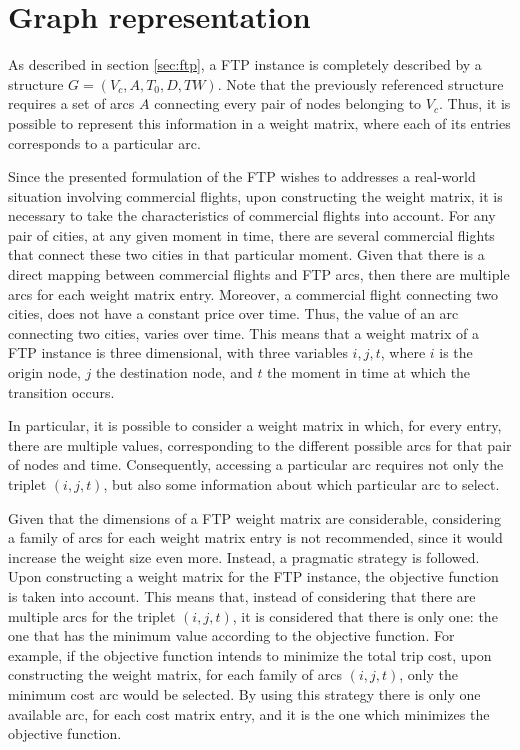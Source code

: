 \section{Graph representation}
\label{sec:ftp_graph}


As described in section \ref{sec:ftp}, a FTP instance is completely described by a structure 
$G =(V_c, A, T_{0}, D, TW)$. Note that the previously referenced structure requires a set of arcs $A$ connecting every pair of nodes belonging to $V_c$. Thus, it is possible to represent this information in a weight matrix, where each of its entries corresponds to a particular arc.

Since the presented formulation of the FTP wishes to addresses a real-world situation involving commercial flights, upon constructing the weight matrix, it is necessary to take the characteristics of commercial flights into account. For any pair of cities, at any given moment in time, there are several commercial flights that connect these two cities in that particular moment. Given that there is a direct mapping between commercial flights and FTP arcs, then there are multiple arcs for each weight matrix entry. Moreover, a commercial flight connecting two cities, does not have a constant price over time. Thus, the value of an arc connecting two cities, varies over time. This means that a weight matrix of a FTP instance is three dimensional, with three variables $i, j, t$, where $i$ is the origin node, $j$ the destination node, and $t$ the moment in time at which the transition occurs.

In particular, it is possible to consider a weight matrix in which, for every entry, there are multiple values, corresponding to the different possible arcs for that pair of nodes and time. Consequently, accessing a particular arc requires not only the triplet $(i, j, t)$, but also some information about which particular arc to select. 

Given that the dimensions of a FTP weight matrix are considerable, considering a family of arcs for each weight matrix entry is not recommended, since it would increase the weight size even more. Instead, a pragmatic strategy is followed. Upon constructing a weight matrix for the FTP instance, the objective function is taken into account. This means that, instead of considering that there are multiple arcs for the triplet $(i, j, t)$, it is considered that there is only one: the one that has the minimum value according to the objective function. For example, if the objective function intends to minimize the total trip cost, upon constructing the weight matrix, for each family of arcs $(i, j, t)$, only the minimum cost arc would be selected. By using this strategy there is only one available arc, for each cost matrix entry, and it is the one which minimizes the objective function.

